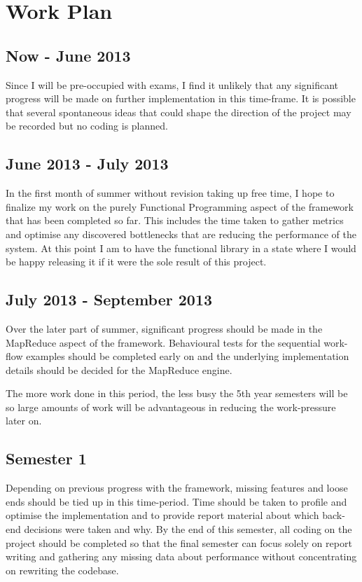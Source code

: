 \section{Work Plan}

\subsection{Now - June 2013}
  Since I will be pre-occupied with exams, I find it unlikely that any significant progress will be made on further implementation in this time-frame. It is possible that several spontaneous ideas that could shape the direction of the project may be recorded but no coding is planned.

\subsection{June 2013 - July 2013}
In the first month of summer without revision taking up free time, I hope to finalize my work on the purely Functional Programming aspect of the framework that has been completed so far. This includes the time taken to gather metrics and optimise any discovered bottlenecks that are reducing the performance of the system. At this point I am to have the functional library in a state where I would be happy releasing it if it were the sole result of this project.

\subsection{July 2013 - September 2013}
Over the later part of summer, significant progress should be made in the MapReduce aspect of the framework. Behavioural tests for the sequential work-flow examples should be completed early on and the underlying implementation details should be decided for the MapReduce engine.

The more work done in this period, the less busy the 5th year semesters will be so large amounts of work will be advantageous in reducing the work-pressure later on.

\subsection{Semester 1}
Depending on previous progress with the framework, missing features and loose ends should be tied up in this time-period. Time should be taken to profile and optimise the implementation and to provide report material about which back-end decisions were taken and why. By the end of this semester, all coding on the project should be completed so that the final semester can focus solely on report writing and gathering any missing data about performance without concentrating on rewriting the codebase.

